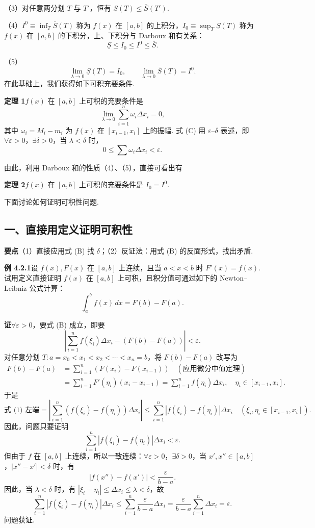 \documentclass[UTF8, 12pt, fontset=fandol, oneside]{ctexart}
\begin{document}
（3）对任意两分划 $T$ 与 $T'$，恒有 $\underline S(T)\le\overline S(T')$.

（4）$I^0\equiv\inf_T\overline S(T)$ 称为 $f(x)$ 在 $[a,b]$ 的上积分，$I_0\equiv\sup_T\underline S(T)$ 称为 $f(x)$ 在 $[a,b]$ 的下积分，上、下积分与 Darboux 和有关系：
\[
\underline S\le I_0\le I^0\le\overline S.
\]

（5）
\[
\lim_{\lambda\to0}\underline S(T)=I_0,\qquad
\lim_{\lambda\to0}\overline S(T)=I^0.
\]
在此基础上，我们获得如下可积充要条件.

\noindent\textbf{定理 1}\quad $f(x)$ 在 $[a,b]$ 上可积的充要条件是
\[
\lim_{\lambda\to0}\sum_{i=1}^n\omega_i\Delta x_i=0,
\tag{C}
\]
其中 $\omega_i=M_i-m_i$ 为 $f(x)$ 在 $[x_{i-1},x_i]$ 上的振幅. 式 (C) 用 $\varepsilon$--$\delta$ 表述，即 $\forall\varepsilon>0$，$\exists\delta>0$，当 $\lambda<\delta$ 时，
\[
0\le\sum\omega_i\Delta x_i<\varepsilon.
\]

由此，利用 Darboux 和的性质（4）、（5），直接可看出有

\noindent\textbf{定理 2}\quad $f(x)$ 在 $[a,b]$ 上可积的充要条件是 $I_0=I^0$.

下面讨论如何证明可积性问题.

\subsection*{一、直接用定义证明可积性}

\noindent\textbf{要点}\quad （1）直接应用式 (B) 找 $\delta$；（2）反证法：用式 (B) 的反面形式，找出矛盾.

\noindent\textbf{例 4.2.1}\quad 设 $f(x),F(x)$ 在 $[a,b]$ 上连续，且当 $a<x<b$ 时 $F'(x)=f(x)$. 试用定义直接证明 $f(x)$ 在 $[a,b]$ 上可积，且积分值可通过如下的 Newton--Leibniz 公式计算：
\[
\int_a^b f(x)\,dx=F(b)-F(a).
\]

\noindent\textbf{证}\quad $\forall\varepsilon>0$，要式 (B) 成立，即要
\[
\left|\sum_{i=1}^n f(\xi_i)\Delta x_i-(F(b)-F(a))\right|<\varepsilon.
\tag{1}
\]
对任意分划 $T:a=x_0<x_1<x_2<\cdots<x_n=b$，将 $F(b)-F(a)$ 改写为
\[
\begin{aligned}
F(b)-F(a)
&=\sum_{i=1}^n(F(x_i)-F(x_{i-1}))\quad(\text{应用微分中值定理})\\
&=\sum_{i=1}^nF'(\eta_i)(x_i-x_{i-1})
=\sum_{i=1}^nf(\eta_i)\Delta x_i,\quad
\eta_i\in[x_{i-1},x_i].
\end{aligned}
\]
于是
\[
\text{式 (1) 左端}
=\left|\sum_{i=1}^n(f(\xi_i)-f(\eta_i))\Delta x_i\right|
\le\sum_{i=1}^n|f(\xi_i)-f(\eta_i)|\Delta x_i
\quad(\xi_i,\eta_i\in[x_{i-1},x_i]).
\]
因此，问题只要证明
\[
\sum_{i=1}^n|f(\xi_i)-f(\eta_i)|\Delta x_i<\varepsilon.
\tag{2}
\]
但由于 $f$ 在 $[a,b]$ 上连续，所以一致连续：$\forall\varepsilon>0$，$\exists\delta>0$，当 $x',x''\in[a,b]$，$|x''-x'|<\delta$ 时，有
\[
|f(x'')-f(x')|<\frac{\varepsilon}{b-a}.
\]
因此，当 $\lambda<\delta$ 时，有 $|\xi_i-\eta_i|\le\Delta x_i\le\lambda<\delta$，故
\[
\sum_{i=1}^n|f(\xi_i)-f(\eta_i)|\Delta x_i
\le\sum_{i=1}^n\frac{\varepsilon}{b-a}\Delta x_i
=\frac{\varepsilon}{b-a}\sum_{i=1}^n\Delta x_i=\varepsilon.
\]
问题获证.
\end{document}
